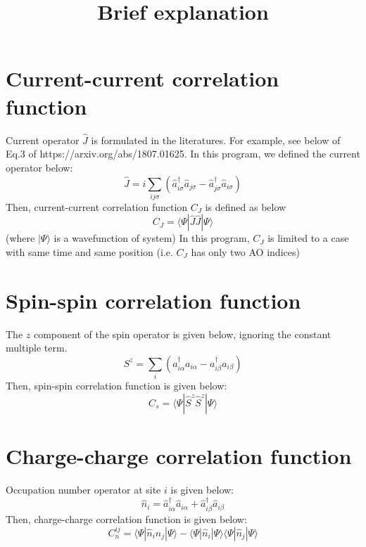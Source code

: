 \documentclass{article}
\begin{document}
\title{Brief explanation}
\maketitle


\section{Current-current correlation function}
Current operator $\hat{J}$ is formulated in the literatures. 
For example, see below of Eq.3 of https://arxiv.org/abs/1807.01625.
In this program, we defined the current operator below:
\begin{equation}
    \hat{J} = i\sum_{ij\sigma} (\hat{a}^{\dagger}_{i\sigma}\hat{a}_{j\sigma} - \hat{a}^{\dagger}_{j\sigma}\hat{a}_{i\sigma})
\end{equation}
Then, current-current correlation function $C_{J}$ is defined as below
\begin{equation}
C_{J} = \langle \Psi | \hat{J}\hat{J} | \Psi \rangle
\end{equation}
(where $|\Psi\rangle$ is a wavefunction of system)
In this program, $C_{J}$ is limited to a case with same time and same position (i.e. $C_{J}$ has only two AO indices)

\section{Spin-spin correlation function}
The $z$ component of the spin operator is given below, ignoring the constant multiple term.
\begin{equation}
    S^{z} = \sum_{i} (a^{\dagger}_{i\alpha}a_{i\alpha} - a^{\dagger}_{i\beta}a_{i\beta})
\end{equation}
Then, spin-spin correlation function is given below:
\begin{equation}
C_{s} = \langle \Psi | \hat{S}^{z}\hat{S}^{z} | \Psi \rangle
\end{equation}

\section{Charge-charge correlation function}
Occupation number operator at site $i$ is given below:
\begin{equation}
\hat{n}_{i} = \hat{a}^{\dagger}_{i\alpha}\hat{a}_{i\alpha} + \hat{a}^{\dagger}_{i\beta}\hat{a}_{i\beta}
\end{equation}
Then, charge-charge correlation function is given below:
\begin{equation}
C_{n}^{ij} = \langle \Psi | \hat{n}_{i}\hat{n}_{j} | \Psi \rangle
- \langle \Psi | \hat{n}_{i} | \Psi \rangle
\langle \Psi | \hat{n}_{j} | \Psi \rangle
\end{equation}
\end{document}
